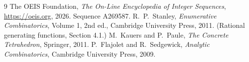 \documentclass[11pt,a4paper]{article}
\theoremstyle{plain}
\theoremstyle{definition}
\begin{document}
\begin{thebibliography}{9}
 The OEIS Foundation, \emph{The On-Line Encyclopedia of Integer
Sequences}, \url{https://oeis.org}, 2026. Sequence A269587.
 R.~P.~Stanley, \emph{Enumerative Combinatorics}, Volume 1, 2nd ed.,
Cambridge University Press, 2011. (Rational generating functions, Section 4.1.)
 M.~Kauers and P.~Paule, \emph{The Concrete Tetrahedron}, Springer, 2011.
 P.~Flajolet and R.~Sedgewick, \emph{Analytic Combinatorics}, Cambridge
University Press, 2009.
\end{thebibliography}
\end{document}
